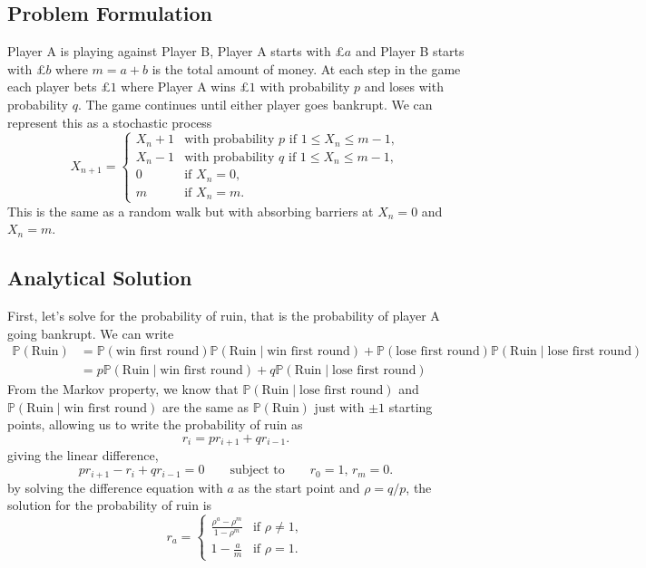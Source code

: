 \documentclass[11pt,a4paper]{article}
\begin{document}
\subsection{Problem Formulation}
Player A is playing against Player B, Player A starts with £$a$ and Player B starts with £$b$ where $m = a+b$ is the total amount of money. At each step in the game each player bets £$1$ where Player A wins £$1$ with probability $p$ and loses with probability $q$. The game continues until either player goes bankrupt. We can represent this as a stochastic process \[X_{n+1} = \begin{cases}
    X_n + 1 &\text{with probability }p \text{ if } 1\leq X_n \leq m-1,\\
    X_n -1 &\text{with probability }q \text{ if } 1\leq X_n \leq m-1,\\
    0 &\text{if }X_n = 0,\\
    m &\text{if }X_n = m.
\end{cases}\] This is the same as a random walk but with absorbing barriers at $X_n=0$ and $X_n = m$.
\subsection{Analytical Solution}
First, let's solve for the probability of ruin, that is the probability of player A going bankrupt. We can write 
\begin{align*}
\mathbb{P}(\text{Ruin}) &= \mathbb{P}(\text{win first round})\mathbb{P}(\text{Ruin} \mid \text{win first round}) + \mathbb{P}(\text{lose first round})\mathbb{P}(\text{Ruin} \mid \text{lose first round})\\
&=p\mathbb{P}(\text{Ruin} \mid \text{win first round}) + q\mathbb{P}(\text{Ruin} \mid \text{lose first round})
\end{align*}
\noindent
From the Markov property, we know that $\mathbb{P}(\text{Ruin} \mid \text{lose first round})$ and $\mathbb{P}(\text{Ruin} \mid \text{win first round})$ are the same as $\mathbb{P}(\text{Ruin})$ just with $\pm1$ starting points, allowing us to write the probability of ruin as \[r_i = pr_{i+1} + qr_{i-1}.\]
giving the linear difference, \[pr_{i+1}-r_i+qr_{i-1}=0 \qquad \text{subject to} \qquad r_0=1,\, r_m=0. \]
\noindent
by solving the difference equation with $a$ as the start point and $\rho = q/p$, the solution for the probability of ruin is \[ r_a = \begin{cases}
    \frac{\rho^a - \rho^m}{1-\rho^m} &\text{if }\rho \ne 1,\\
    1-\frac{a}{m} &\text{if }\rho = 1.
\end{cases}\]
\end{document}
